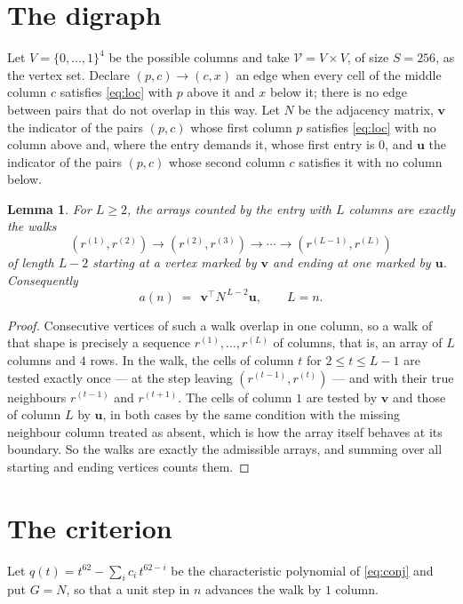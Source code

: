 \documentclass[11pt,a4paper]{article}
\theoremstyle{plain}
\newtheorem{lemma}[theorem]{Lemma}
\theoremstyle{definition}
\begin{document}
\section{The digraph}

Let $V=\{0,\dots,1\}^{4}$ be the possible columns and take
$\mathcal V=V\times V$, of size $S=256$, as the vertex set. Declare $(p,c)\to(c,x)$ an edge
when every cell of the middle column $c$ satisfies \eqref{eq:loc} with $p$ above it and $x$
below it; there is no edge between pairs that do not overlap in this way. Let $N$ be the
adjacency matrix, $\mathbf{v}$ the indicator of the pairs $(p,c)$ whose first column $p$
satisfies \eqref{eq:loc} with no column above and, where the entry demands it, whose first entry is $0$, and $\mathbf{u}$ the indicator of
the pairs $(p,c)$ whose second column $c$ satisfies it with no column below.

\begin{lemma}\label{lem:walk}
For $L\ge2$, the arrays counted by the entry with $L$ columns are exactly the walks
\[
(r^{(1)},r^{(2)})\to(r^{(2)},r^{(3)})\to\cdots\to(r^{(L-1)},r^{(L)})
\]
of length $L-2$ starting at a vertex marked by $\mathbf{v}$ and ending at one marked by
$\mathbf{u}$. Consequently
\[
a(n)\;=\;\,\mathbf{v}^{\!\top}N^{\,L-2}\mathbf{u},\qquad L=n .
\]
\end{lemma}

\begin{proof}
Consecutive vertices of such a walk overlap in one column, so a walk of that shape is
precisely a sequence $r^{(1)},\dots,r^{(L)}$ of columns, that is, an array of $L$ columns
and $4$ rows. In the walk, the cells of column $t$ for $2\le t\le L-1$ are tested
exactly once --- at the step leaving $(r^{(t-1)},r^{(t)})$ --- and with their true
neighbours $r^{(t-1)}$ and $r^{(t+1)}$. The cells of column $1$ are tested by
$\mathbf{v}$ and those of column $L$ by $\mathbf{u}$, in both cases by the same condition
with the missing neighbour column treated as absent, which is how the array itself behaves at
its boundary. So the walks are exactly the admissible arrays, and summing over all starting
and ending vertices counts them.
\end{proof}

\section{The criterion}

Let $q(t)=t^{62}-\sum_i c_i\,t^{62-i}$ be the characteristic polynomial of
\eqref{eq:conj} and put $G=N$, so that a unit step in $n$ advances the walk by
$1$ column.
\end{document}
